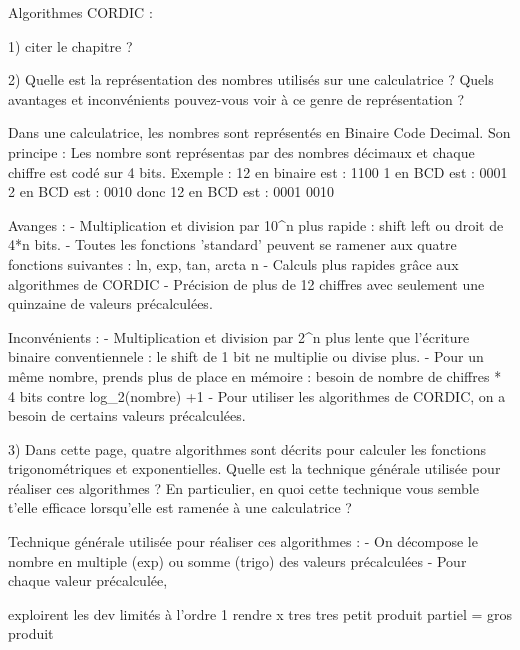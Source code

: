 \documentclass{article}
\begin{document}
Algorithmes CORDIC :


1) citer le chapitre ?

2) Quelle est la représentation des nombres utilisés sur une calculatrice ? Quels avantages et inconvénients pouvez-vous voir à ce genre de représentation ?

Dans une calculatrice, les nombres sont représentés en Binaire Code Decimal. Son principe : Les nombre sont représentas par des nombres décimaux et chaque chiffre est codé sur 4 bits.
Exemple :
12 en binaire est : 1100
1 en BCD est : 0001
2 en BCD est : 0010
donc 12 en BCD est : 0001 0010

Avanges :
- Multiplication et division par 10^n plus rapide : shift left ou droit de 4*n bits.
- Toutes les fonctions 'standard' peuvent se ramener aux quatre fonctions suivantes :  ln, exp, tan, arcta n
- Calculs plus rapides grâce aux algorithmes de CORDIC
- Précision de plus de 12 chiffres avec seulement une quinzaine de valeurs précalculées.

Inconvénients :
- Multiplication et division par 2^n plus lente que l'écriture binaire conventiennele : le shift de 1 bit ne multiplie ou divise plus.
- Pour un même nombre, prends plus de place en mémoire : besoin de nombre de chiffres * 4 bits contre log_2(nombre) +1
- Pour utiliser les algorithmes de CORDIC, on a besoin de certains valeurs précalculées.

3) Dans cette page, quatre algorithmes sont décrits pour calculer les fonctions trigonométriques et exponentielles. Quelle est la technique générale utilisée pour réaliser ces algorithmes ? En particulier, en quoi cette technique vous semble t’elle efficace lorsqu’elle est ramenée à une calculatrice ?

Technique générale utilisée pour réaliser ces algorithmes :
- On décompose le nombre en multiple (exp) ou somme (trigo) des valeurs précalculées
- Pour chaque valeur précalculée,

exploirent les dev limités à l'ordre 1
rendre x tres tres petit
produit partiel = gros produit
\end{document}
